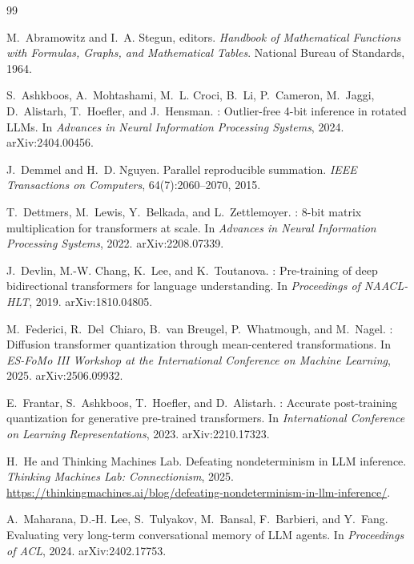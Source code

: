 \documentclass[10pt]{article}
\begin{document}
\begin{thebibliography}{99}
\small

M.~Abramowitz and I.~A. Stegun, editors.
\newblock \emph{Handbook of Mathematical Functions with Formulas, Graphs, and
  Mathematical Tables}.
\newblock National Bureau of Standards, 1964.

S.~Ashkboos, A.~Mohtashami, M.~L. Croci, B.~Li, P.~Cameron, M.~Jaggi,
  D.~Alistarh, T.~Hoefler, and J.~Hensman.
: Outlier-free 4-bit inference in rotated {LLMs}.
\newblock In \emph{Advances in Neural Information Processing Systems}, 2024.
\newblock arXiv:2404.00456.

J.~Demmel and H.~D. Nguyen.
\newblock Parallel reproducible summation.
\newblock \emph{IEEE Transactions on Computers}, 64(7):2060--2070, 2015.

T.~Dettmers, M.~Lewis, Y.~Belkada, and L.~Zettlemoyer.
: 8-bit matrix multiplication for transformers at scale.
\newblock In \emph{Advances in Neural Information Processing Systems}, 2022.
\newblock arXiv:2208.07339.

J.~Devlin, M.-W. Chang, K.~Lee, and K.~Toutanova.
: Pre-training of deep bidirectional transformers for language
  understanding.
\newblock In \emph{Proceedings of NAACL-HLT}, 2019.
\newblock arXiv:1810.04805.

M.~Federici, R.~Del~Chiaro, B.~van Breugel, P.~Whatmough, and M.~Nagel.
: Diffusion transformer quantization through mean-centered
  transformations.
\newblock In \emph{ES-FoMo III Workshop at the International Conference on
  Machine Learning}, 2025.
\newblock arXiv:2506.09932.

E.~Frantar, S.~Ashkboos, T.~Hoefler, and D.~Alistarh.
: Accurate post-training quantization for generative
  pre-trained transformers.
\newblock In \emph{International Conference on Learning Representations}, 2023.
\newblock arXiv:2210.17323.

H.~He and Thinking Machines Lab.
\newblock Defeating nondeterminism in {LLM} inference.
\newblock \emph{Thinking Machines Lab: Connectionism}, 2025.
\newblock
  \url{https://thinkingmachines.ai/blog/defeating-nondeterminism-in-llm-inference/}.

A.~Maharana, D.-H. Lee, S.~Tulyakov, M.~Bansal, F.~Barbieri, and Y.~Fang.
\newblock Evaluating very long-term conversational memory of {LLM} agents.
\newblock In \emph{Proceedings of ACL}, 2024.
\newblock arXiv:2402.17753.


\end{thebibliography}
\end{document}
